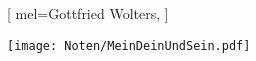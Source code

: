 [
    mel={Gottfried Wolters},
    ]

\centering\texttt{[image: Noten/MeinDeinUndSein.pdf]}

\endsong
